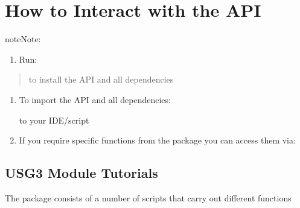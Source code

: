 \documentclass[letterpaper,10pt,english]{sphinxmanual}
\begin{document}
\chapter{How to Interact with the API}
\label{\detokenize{index:how-to-interact-with-the-api}}
\begin{sphinxadmonition}{note}{Note:}\begin{enumerate}
%
\item {} 
\sphinxAtStartPar
Run:

\end{enumerate}
\begin{quote}

\sphinxAtStartPar
{}

\sphinxAtStartPar
to install the API and all dependencies
\end{quote}
\begin{enumerate}
%
\setcounter{enumi}{1}
\item {} 
\sphinxAtStartPar
To import the API and all dependencies:

\begin{sphinxVerbatim}[commandchars=\\\{\}]
 
\end{sphinxVerbatim}

\sphinxAtStartPar
to your IDE/script

\item {} 
\sphinxAtStartPar
If you require specific functions from the package you can access them via:

\begin{sphinxVerbatim}[commandchars=\\\{\}]
    
\end{sphinxVerbatim}

\end{enumerate}
\end{sphinxadmonition}


\section{USG3 Module Tutorials}
\label{\detokenize{tutorial:usg3-module-tutorials}}\label{\detokenize{tutorial::doc}}
\sphinxAtStartPar
The package consists of a number of scripts that carry out different functions
\end{document}
